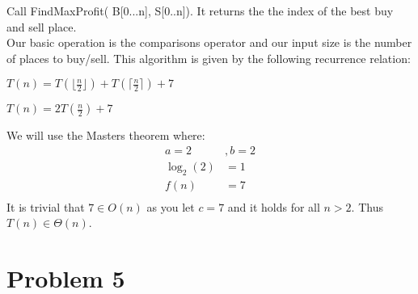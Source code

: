 \documentclass[12pt]{article}
\begin{document}
Call FindMaxProfit( B[0...n], S[0..n]).  It returns the the index of the best buy and sell place.\\
Our basic operation is the comparisons operator and our input size is the number of places to buy/sell.
This algorithm is given by the following recurrence relation: \\
\centerline{ $T(n) = T(\lfloor \frac{n}{2} \rfloor) + T(\lceil \frac{n}{2} \rceil) + 7$ }
\centerline{ $T(n) = 2T(\frac{n}{2}) + 7$ }
We will use the Masters theorem where: \\
\begin{align*}
a  = 2 &,
 b  = 2   \\
 \log_2(2) & = 1 \\
f(n) & = 7 \\
\end{align*}
It is trivial that $ 7 \in O(n)$ as you let $c =7$ and it holds for all $n>2$.
Thus $T(n) \in \Theta(n)$.


\section{Problem 5}
\end{document}
